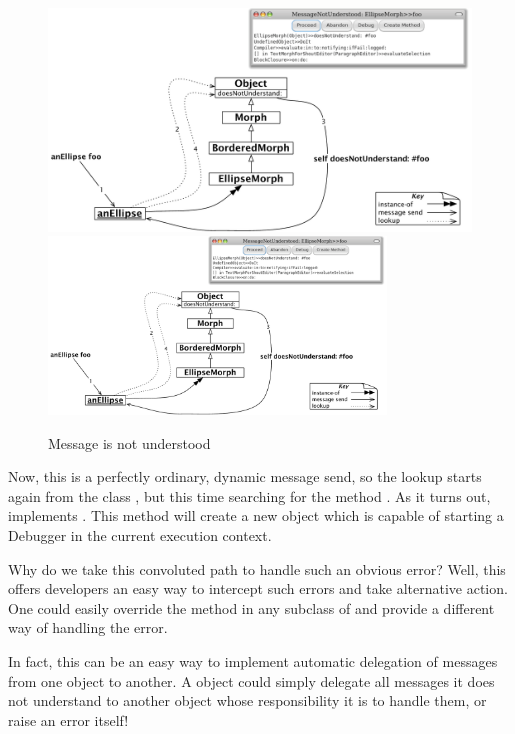 \documentclass[a4paper,10pt,twoside]{book}
\begin{document}
\begin{figure}[htb]
\begin{center}
\ifluluelse
	{\includegraphics[width=\textwidth]{fooNotFound}}
	{\includegraphics[width=0.8\textwidth]{fooNotFound}}
\caption{Message  is not understood}
\end{center}
\end{figure}

Now, this is a perfectly ordinary, dynamic message send, so the lookup starts again from the class , but this time searching for the method .
As it turns out,  implements .
This method will create a new  object which is capable of starting a Debugger in the current execution context.

Why do we take this convoluted path to handle such an obvious error?
Well, this offers developers an easy way to intercept such errors and take alternative action.
One could easily override the method  in any subclass of  and  provide a different way of handling the error.

In fact, this can be an easy way to implement automatic delegation of messages from one object to another.
A  object could simply delegate all messages it does not understand to another object whose responsibility it is to handle them, or raise an error itself!
\end{document}
